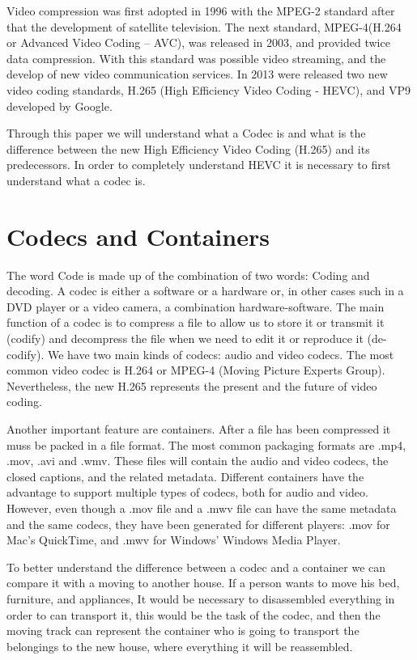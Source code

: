 \documentclass[10pt,journal,compsoc]{IEEEtran}
\begin{document}
Video compression was first adopted in 1996 with the MPEG-2 standard after that the development of satellite television. The next standard, MPEG-4(H.264 or Advanced Video Coding – AVC), was released in 2003, and provided twice data compression. With this standard was possible video streaming, and the develop of new video communication services. In 2013 were released two new video coding standards, H.265 (High Efficiency Video Coding - HEVC), and VP9 developed by Google. \cite{simple}

Through this paper we will understand what a Codec is and what is the difference between the new High Efficiency Video Coding (H.265) and its predecessors. In order to completely understand HEVC it is necessary to first understand what a codec is.    

\section{Codecs and Containers}

The word Code is made up of the combination of two words: Coding and decoding. A codec is either a software or a hardware or, in other cases such in a DVD player or a video camera, a combination hardware-software. The main function of a codec is to compress a file to allow us to store it or transmit it (codify) and decompress the file when we need to edit it or reproduce it (de-codify). We have two main kinds of codecs: audio and video codecs. The most common video codec is H.264 or MPEG-4 (Moving Picture Experts Group). Nevertheless, the new H.265 represents the present and the future of video coding. \cite{codec}

Another important feature are containers. After a file has been compressed it muss be packed in a file format. The most common packaging formats are .mp4, .mov, .avi and .wmv. These files will contain the audio and video codecs, the closed captions, and the related metadata.  Different containers have the advantage to support multiple types of codecs, both for audio and video. However, even though a .mov file and a .mwv file can have the same metadata and the same codecs, they have been generated for different players: .mov for Mac’s QuickTime, and .mwv for Windows’ Windows Media Player. \cite{encoding}

To better understand the difference between a codec and a container we can compare it with a moving to another house. If a person wants to move his bed, furniture, and appliances, It would be necessary to disassembled everything in order to can transport it, this would be the task of the codec, and then the moving track can represent the container who is going to transport the belongings to the new house, where everything it will be reassembled. 
\end{document}
